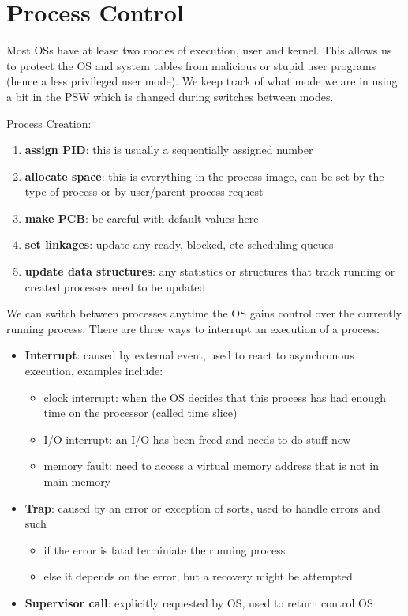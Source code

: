 \documentclass[12pt]{article}
\begin{document}
\section{Process Control}
Most OSs have at lease two modes of execution, user and kernel. This allows us to protect the OS and system tables from malicious or stupid user programs (hence a less privileged user mode). We keep track of what mode we are in using a bit in the PSW which is changed during switches between modes.

Process Creation:
\begin{enumerate}
    \item \textbf{assign PID}: this is usually a sequentially assigned number
    \item \textbf{allocate space}: this is everything in the process image, can be set by the type of process or by user/parent process request
    \item \textbf{make PCB}: be careful with default values here
    \item \textbf{set linkages}: update any ready, blocked, etc scheduling queues
    \item \textbf{update data structures}: any statistics or structures that track running or created processes need to be updated
\end{enumerate}

We can switch between processes anytime the OS gains control over the currently running process. There are three ways to interrupt an execution of a process:
\begin{itemize}
    \item \textbf{Interrupt}: caused by external event, used to react to asynchronous execution, examples include:
    \begin{itemize}
        \item clock interrupt: when the OS decides that this process has had enough time on the processor (called time slice)
        \item I/O interrupt: an I/O has been freed and needs to do stuff now
        \item memory fault: need to access a virtual memory address that is not in main memory
    \end{itemize}
    \item \textbf{Trap}: caused by an error or exception of sorts, used to handle errors and such
        \begin{itemize}
            \item if the error is fatal terminiate the running process
            \item else it depends on the error, but a recovery might be attempted
        \end{itemize}
    \item \textbf{Supervisor call}: explicitly requested by OS, used to return control OS
\end{itemize}
\end{document}
